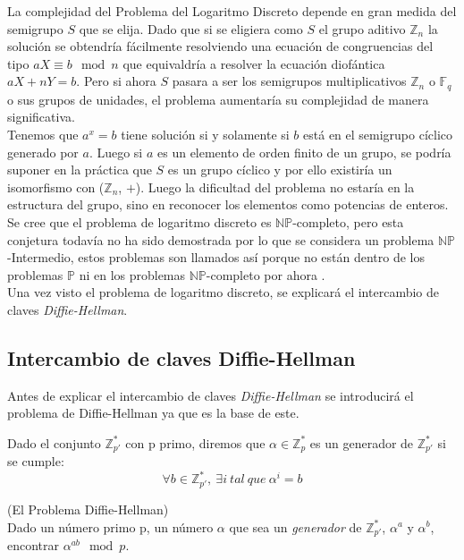 La complejidad del Problema del Logaritmo Discreto depende en gran medida del semigrupo $S$ que se elija.
Dado que si se eligiera como $S$ el grupo aditivo $\mathbb{Z}_n$ la solución se obtendría fácilmente resolviendo una ecuación de congruencias del tipo $aX \equiv b \mod n$ que equivaldría a resolver la ecuación diofántica $aX + nY = b$. Pero si ahora $S$ pasara a ser los semigrupos multiplicativos $\mathbb{Z}_n$ o $\mathbb{F}_q$ o sus grupos de unidades, el problema aumentaría su complejidad de manera significativa.\\
Tenemos que $a^x = b$ tiene solución si y solamente si $b$ está en el semigrupo cíclico generado por $a$. Luego si $a$ es un elemento de orden finito de un grupo, se podría suponer en la práctica que $S$ es un grupo cíclico y por ello existiría un isomorfismo con ($\mathbb{Z}_n$, $+$). Luego la dificultad del problema no estaría en la estructura del grupo, sino en reconocer los elementos como potencias de enteros.\\
Se cree que el problema de logaritmo discreto es $\mathbb{NP}$-completo, pero esta conjetura todavía no ha sido demostrada por lo que se considera un problema $\mathbb{NP}$-Intermedio, estos problemas son llamados así porque no están dentro de los problemas $\mathbb{P}$ ni en los problemas $\mathbb{NP}$-completo por ahora \cite{NP-intermedio}.\\
Una vez visto el problema de logaritmo discreto, se explicará el intercambio de claves \emph{Diffie-Hellman}.
\subsection{Intercambio de claves Diffie-Hellman}
Antes de explicar el intercambio de claves \emph{Diffie-Hellman} se introducirá el problema de Diffie-Hellman ya que es la base de este.\\

\begin{definicion}
	Dado el conjunto $\mathbb{Z}^*_{p'}$ con p primo, diremos que $\alpha \in \mathbb{Z}^*_p$ es un generador de $\mathbb{Z}^*_{p'}$ si se cumple:\\
	$$
		\forall b \in \mathbb{Z}^*_{p'},\: \exists i\: tal \: que \: \alpha^i = b
	$$
\end{definicion}

\begin{definicion}
	(El Problema Diffie-Hellman)\\ Dado un número primo p, un número $\alpha$ que sea un \emph{generador} de $\mathbb{Z}^*_{p'}$, $\alpha^a$ y $\alpha^b$, encontrar $\alpha^{ab} \mod p$.  
\end{definicion}

